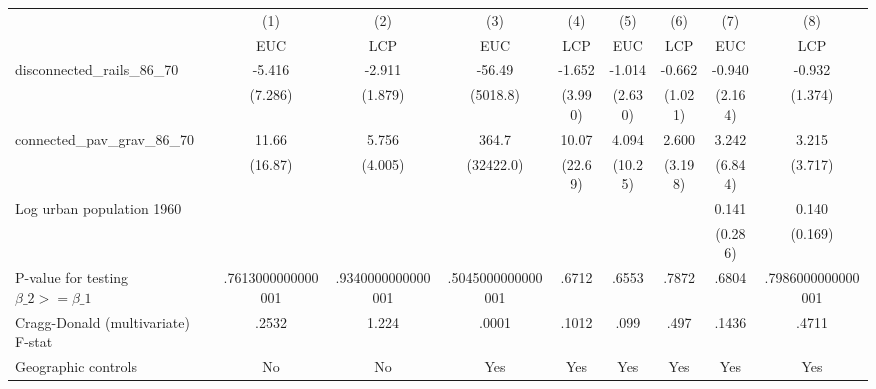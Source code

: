 {
\def\sym#1{\ifmmode^{#1}\else\(^{#1}\)\fi}
\begin{tabular}{l*{8}{c}}
\hline\hline
                &\multicolumn{1}{c}{(1)}&\multicolumn{1}{c}{(2)}&\multicolumn{1}{c}{(3)}&\multicolumn{1}{c}{(4)}&\multicolumn{1}{c}{(5)}&\multicolumn{1}{c}{(6)}&\multicolumn{1}{c}{(7)}&\multicolumn{1}{c}{(8)}\\
                &\multicolumn{1}{c}{EUC}&\multicolumn{1}{c}{LCP}&\multicolumn{1}{c}{EUC}&\multicolumn{1}{c}{LCP}&\multicolumn{1}{c}{EUC}&\multicolumn{1}{c}{LCP}&\multicolumn{1}{c}{EUC}&\multicolumn{1}{c}{LCP}\\
\hline
disconnected\_rails\_86\_70&   -5.416         &   -2.911         &   -56.49         &   -1.652         &   -1.014         &   -0.662         &   -0.940         &   -0.932         \\
                &  (7.286)         &  (1.879)         & (5018.8)         &  (3.990)         &  (2.630)         &  (1.021)         &  (2.164)         &  (1.374)         \\
[1em]
connected\_pav\_grav\_86\_70&    11.66         &    5.756         &    364.7         &    10.07         &    4.094         &    2.600         &    3.242         &    3.215         \\
                &  (16.87)         &  (4.005)         &(32422.0)         &  (22.69)         &  (10.25)         &  (3.198)         &  (6.844)         &  (3.717)         \\
[1em]
Log urban population 1960&                  &                  &                  &                  &                  &                  &    0.141         &    0.140         \\
                &                  &                  &                  &                  &                  &                  &  (0.286)         &  (0.169)         \\
\hline
P-value for testing $\beta\_{2} >= \beta\_{1}$&.7613000000000001         &.9340000000000001         &.5045000000000001         &    .6712         &    .6553         &    .7872         &    .6804         &.7986000000000001         \\
Cragg-Donald (multivariate) F-stat&    .2532         &    1.224         &    .0001         &    .1012         &     .099         &     .497         &    .1436         &    .4711         \\
Geographic controls&       No         &       No         &      Yes         &      Yes         &      Yes         &      Yes         &      Yes         &      Yes         \\

\end{tabular}}
